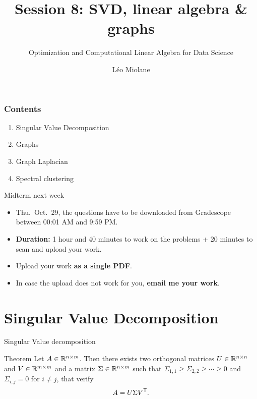 \documentclass{beamer}
\title{Session 8: SVD, linear algebra \& graphs}
\subtitle{Optimization and Computational Linear Algebra for Data Science}
\author{Léo Miolane}
\date{}
\begin{document}
\setcounter{showProgressBar}{0}
\setcounter{showSlideNumbers}{0}

\frame{\titlepage}

\begin{frame}
	\frametitle{Contents}
	\begin{enumerate}
		\item Singular Value Decomposition
		\item Graphs
		\item Graph Laplacian
		\item Spectral clustering
	\end{enumerate}
\end{frame}

\begin{frame}{Midterm next week}
	\begin{itemize}
		\item Thu.\ Oct.\ 29, the questions have to be downloaded from Gradescope between 00:01 AM and 9:59 PM.
			\vspace{2mm}
		\item \textbf{Duration:} 1 hour and 40 minutes to work on the problems + 20 minutes to scan and upload your work.
			\vspace{2mm}
		\item Upload your work \textbf{as a single PDF}.
			\vspace{2mm}
		\item In case the upload does not work for you, \textbf{email me your work}.
	\end{itemize}
\end{frame}

\setcounter{framenumber}{0}
\setcounter{showSlideNumbers}{1}


\section{Singular Value Decomposition}


\begin{frame}[t]{Singular Value decomposition}
	\grid

	\vspace{-0.3cm}
	\begin{block}{Theorem}
		Let $A \in \mathbb{R}^{n \times m}$. Then there exists two orthogonal matrices $U \in \mathbb{R}^{n \times n}$ and $V \in \mathbb{R}^{m \times m}$ and a matrix $\Sigma \in \mathbb{R}^{n \times m}$ such that $\Sigma_{1,1} \geq \Sigma_{2,2}  \geq \cdots \geq 0$ and $\Sigma_{i,j} = 0$ for $i\neq j$, that verify
		$$
		A = U \Sigma V^{{\sf T}}.
		$$
	\end{block}
\end{frame}
\end{document}

